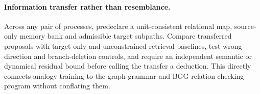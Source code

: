 \paragraph{Information transfer rather than resemblance.} Across any pair of processes, predeclare a unit-consistent relational map, source-only memory bank and admissible target subpaths. Compare transferred proposals with target-only and unconstrained retrieval baselines, test wrong-direction and branch-deletion controls, and require an independent semantic or dynamical residual bound before calling the transfer a deduction. This directly connects analogy training to the graph grammar and BGG relation-checking program without conflating them.

